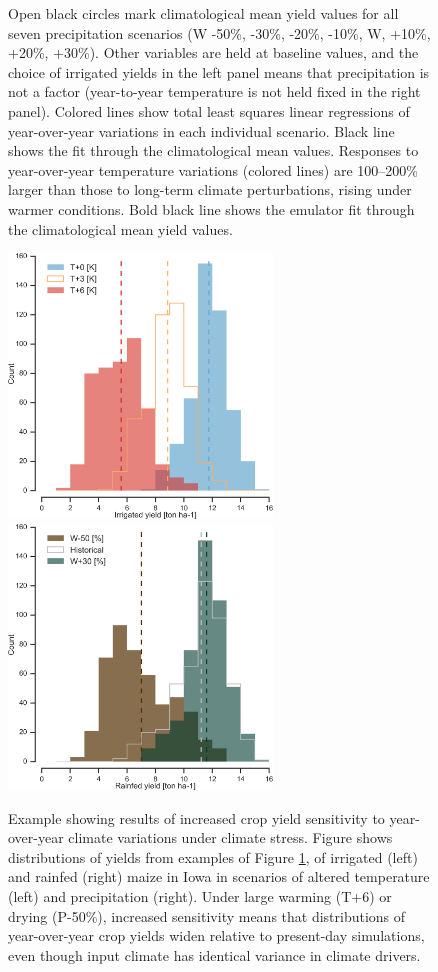 \documentclass[gmd, manuscript]{copernicus} %
\begin{document}
\begin{figure}[ht]
{   Open black circles mark climatological mean yield values for all seven precipitation scenarios (W -50\%, -30\%, -20\%, -10\%, W, +10\%, +20\%, +30\%). 
   Other variables are held at baseline values, and the choice of irrigated yields in the left panel means that precipitation is not a factor (year-to-year temperature is not held fixed in the right panel). 
   Colored lines show total least squares linear regressions of year-over-year variations in each individual scenario. 
   Black line shows the fit through the climatological mean values.  
   Responses to year-over-year temperature variations (colored lines) are 100--200\% larger than those to long-term climate perturbations, rising under warmer conditions. 
   Bold black line shows the emulator fit through the climatological mean yield values.
   }
   \label{fig:yearvclim}
\end{figure}

\begin{figure}[ht]
\centering
   \includegraphics[width=7cm]{figures/hist_year_t.png} \hspace{10mm} \includegraphics[width=7cm]{figures/hist_year_pr.png}
   \caption{
   Example showing results of increased crop yield sensitivity to year-over-year climate variations under climate stress. 
   Figure shows distributions of yields from examples of Figure \ref{fig:yearvclim}, of irrigated (left) and rainfed (right) maize in Iowa in scenarios of altered temperature (left) and precipitation (right).
   Under large warming (T+6) or drying (P-50\%), increased sensitivity means that distributions of year-over-year crop yields widen relative to present-day simulations, even though input climate has identical variance in climate drivers.
   }
   \label{fig:yearly}
\end{figure}
\end{document}
